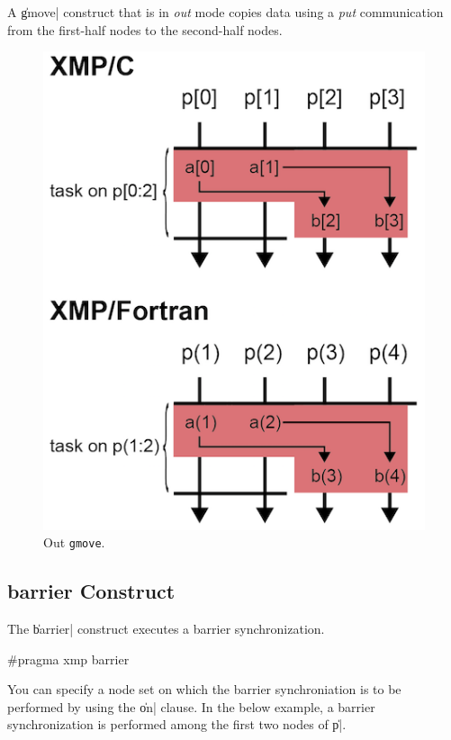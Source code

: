 A \|gmove| construct that is in {\it out} mode copies data using a {\it put}
communication from the first-half nodes to the second-half nodes.

\begin{figure}
  \centering
  \includegraphics{figs/gmove_out.png}
  \caption{Out {\tt gmove}.}
\end{figure}


\subsection{{\bf barrier} Construct}

The \|barrier| construct executes a barrier synchronization.

\begin{XCexample}
#pragma xmp barrier
\end{XCexample}


You can specify a node set on which the barrier synchroniation is to be
performed by using the \|on| clause. In the below example, a barrier
synchronization is performed among the first two nodes of \|p|.

